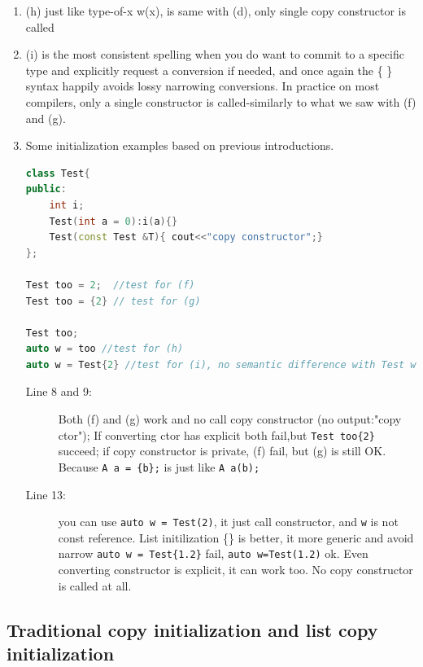 \documentclass[a4paper,11pt,twoside]{book}
\begin{document}
\begin{itemize}
\begin{enumerate}
		\item (h) just like type-of-x w(x), is same with (d), only single copy constructor is called
		
		\item (i) is the most consistent spelling when you do want to commit to a specific type and explicitly request a conversion if needed, and once again the \{ \} syntax happily avoids lossy narrowing conversions. In practice on most compilers, only a single constructor is called-similarly to what we saw with (f) and (g).
		
		\item Some initialization examples based on previous introductions.
		
\begin{lstlisting}[frame=single, language=c++,mathescape=true]
class Test{
public:
	int i;
	Test(int a = 0):i(a){}
	Test(const Test &T){ cout<<"copy constructor";} 
};
		
Test too = 2;  //test for (f) 
Test too = {2} // test for (g)
		
Test too;  
auto w = too //test for (h)
auto w = Test{2} //test for (i), no semantic difference with Test w{2};
\end{lstlisting}
\begin{description}
	\item[Line 8 and 9:] Both (f) and (g) work and no call copy constructor (no output:"copy ctor"); If converting ctor has explicit both fail,but \texttt{Test too\{2\}} succeed; if copy constructor is private, (f) fail, but (g) is still OK. Because \texttt{A a = \{b\};} is just like \texttt{A a(b);}

	
	\item[Line 13:] you can use \texttt{auto w = Test(2)}, it just call constructor, and \texttt{w} is not const reference. List initilization \{\} is better, it more generic and avoid narrow \texttt{auto w = Test\{1.2\}} fail, \texttt{auto w=Test(1.2)} ok. Even converting constructor is explicit, it can work too. No copy constructor is called at all.
\end{description}

	\end{enumerate}

\end{itemize}

\subsection{Traditional copy initialization and list copy initialization}
\end{document}
